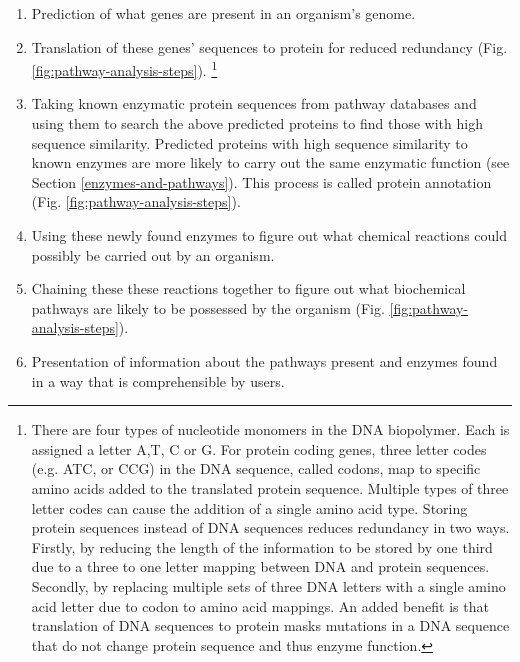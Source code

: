 \begin{enumerate}
\item Prediction of what genes are present in an organism's genome.
\item Translation of these genes' sequences to protein for reduced redundancy (Fig. \ref{fig:pathway-analysis-steps}). \footnote{There are four types of nucleotide monomers in the DNA biopolymer. Each is assigned a letter A,T, C or G. For protein coding genes, three letter codes (e.g. ATC, or CCG) in the DNA sequence, called codons, map to specific amino acids added to the translated protein sequence. Multiple types of three letter codes can cause the addition of a single amino acid type. Storing protein sequences instead of DNA sequences reduces redundancy in two ways. Firstly, by reducing the length of the information to be stored by one third due to a three to one letter mapping between DNA and protein sequences. Secondly, by replacing multiple sets of three DNA letters with a single amino acid letter due to codon to amino acid mappings. An added benefit is that translation of DNA sequences to protein masks mutations in a DNA sequence that do not change protein sequence and thus enzyme function.} 
\item Taking known enzymatic protein sequences from pathway databases and using them to search the above predicted proteins to find those with high sequence similarity. Predicted proteins with high sequence similarity to known enzymes are more likely to carry out the same enzymatic function (see Section \ref{enzymes-and-pathways}). This process is called protein annotation (Fig. \ref{fig:pathway-analysis-steps}).
\item Using these newly found enzymes to figure out what chemical reactions could possibly be carried out by an organism.
\item Chaining these these reactions together to figure out what biochemical pathways are likely to be possessed by the organism (Fig. \ref{fig:pathway-analysis-steps}).
\item Presentation of information about the pathways present and enzymes found in a way that is comprehensible by users.
\end{enumerate}

